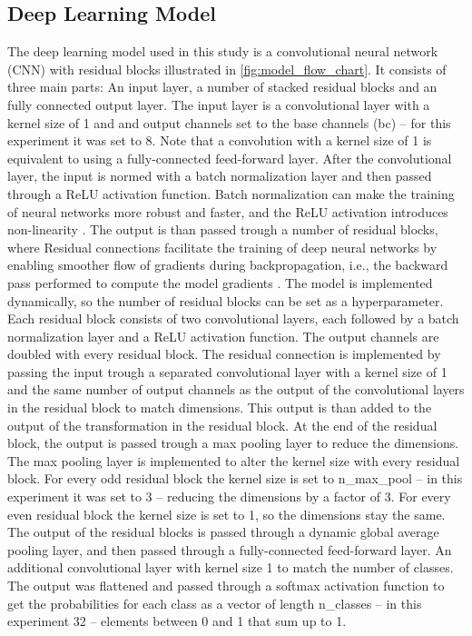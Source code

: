 \subsection{Deep Learning Model}%

The deep learning model used in this study is a convolutional neural network (CNN) with residual blocks \autocite[ResNet; ][]{heDeepResidualLearning2016}
illustrated in \autoref{fig:model_flow_chart}. It consists of three main parts: An input layer,
a number of stacked residual blocks and an fully connected output layer. The input layer is a convolutional layer with a kernel
size of 1 and and output channels set to the base channels (bc) -- for this experiment it was set to 8.
Note that a convolution with a kernel size of 1 is equivalent to using a fully-connected feed-forward layer.
After the convolutional layer, the input is normed with a batch normalization layer and then passed through
a ReLU activation function. Batch normalization can make the training of neural networks more robust and faster, 
and the ReLU activation introduces non-linearity \autocite{Goodfellow-et-al-201}.
The output is than passed trough a number of residual blocks, where
Residual connections facilitate the training of deep neural networks by enabling smoother flow of gradients 
during backpropagation, i.e., the backward pass performed to compute the model gradients \autocite{Goodfellow-et-al-201}. 
The model is implemented dynamically, so the number of residual blocks can be set as a hyperparameter. Each residual block
consists of two convolutional layers, each followed by a batch normalization layer and a ReLU activation function.
The output channels are doubled with every residual block.
The residual connection is implemented by passing the input trough a separated convolutional layer with a kernel size of 1
and the same number of output channels as the output of the convolutional layers in the residual block to
match dimensions. This output is than added to the output of the transformation in the residual block.
At the end of the residual block, the output is passed trough a max pooling layer to reduce the dimensions.
The max pooling layer is implemented to alter the kernel size with every residual block. For every odd residual block
the kernel size is set to n\_max\_pool -- in this experiment it was set to 3 -- reducing the dimensions by a factor of 3.
For every even residual block the kernel size is set to 1, so the dimensions stay the same. The output of the residual blocks
is passed through a dynamic global average pooling layer, and then passed through a fully-connected feed-forward layer. An additional
convolutional layer with kernel size 1 to match the number of classes. The output was flattened and passed through a 
softmax activation function to get the probabilities for each class as a vector of length 
n\_classes -- in this experiment 32 -- elements between 0 and 1 that sum up to 1.

